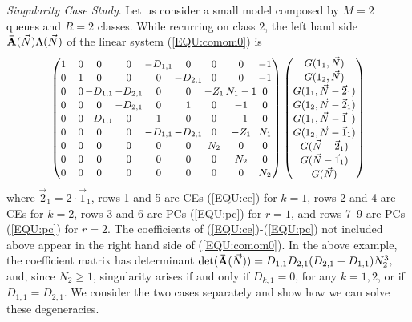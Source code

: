 \documentclass[journal,twocolumn,9.5pt]{IEEEtran}
\newcommand{\comom}[1]{\bar{#1}}
\begin{document}
{\em Singularity Case Study}. Let us consider a small model composed by $M=2$ queues and $R=2$ classes. While recurring on class $2$, the left hand side ${\bf \comom{A}}(\vec N)\Lambda(\vec N)$ of the linear system (\ref{EQU:comom0}) is
\[
\renewcommand{\arraystretch}{1.1}
\arraycolsep 0.08em
\footnotesize
\begin{pmatrix}
    1&  \quad  0&    0&    0& -D_{1,1}&    0&    0&   0&    -1\\
    0&  \quad  1&    0&    0&    0& -D_{2,1}&    0&   0&    -1\\
    0&  \quad  0& -D_{1,1}& -D_{2,1}&    0&    0&  -Z_1& N_1-1&    0\\
    0&  \quad  0&    0& -D_{2,1}&    0&    1&    0&   -1&    0\\
    0&  \quad  0& -D_{1,1}&    0&    1&    0&    0&   -1&    0\\
    0&  \quad  0&    0&    0& -D_{1,1}& -D_{2,1}&    0&  -Z_1&   N_1\\
    0&  \quad  0&    0&    0&    0&    0&   N_2&    0&    0\\
    0&  \quad  0&    0&    0&    0&    0&    0&   N_2&    0\\
    0&  \quad  0&    0&    0&    0&    0&    0&    0&   N_2\\
\end{pmatrix}
\begin{pmatrix}
\small
\renewcommand{\arraystretch}{1.1}
\arraycolsep 0.1em
G(1_1,\vec N)\\
G(1_2,\vec N)\\
G(1_1,\vec N-\vec 2_1)\\
G(1_2,\vec N-\vec 2_1)\\
G(1_1,\vec N-\vec 1_1)\\
G(1_2,\vec N-\vec 1_1)\\
G(\vec N-\vec 2_1)\\
G(\vec N-\vec 1_1)\\
G(\vec N)\\
\end{pmatrix}
\]
where $\vec 2_1=2\cdot \vec 1_1$, rows 1 and 5 are CEs (\ref{EQU:ce}) for $k=1$, rows 2 and 4 are CEs for $k=2$, rows 3 and 6 are PCs (\ref{EQU:pc}) for $r=1$, and rows 7--9 are PCs (\ref{EQU:pc}) for $r=2$. The coefficients of (\ref{EQU:ce})-(\ref{EQU:pc}) not included above appear in the right hand side of (\ref{EQU:comom0}).
In the above example, the coefficient matrix has determinant $\det({\bf \comom{A}}(\vec N))=D_{1,1}D_{2,1}(D_{2,1}-D_{1,1})N_2^3,$
and, since $N_2\geq 1$, singularity arises if and only if $D_{k,1}=0$, for any $k=1,2$, or if $D_{1,1}=D_{2,1}$. We consider the two cases separately and show how we can solve these degeneracies.
\end{document}

